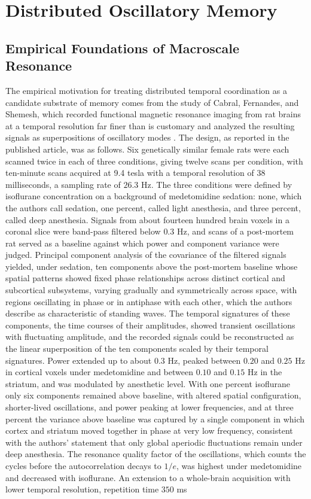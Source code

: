 \part{Distributed Oscillatory Memory}

\chapter{Empirical Foundations of Macroscale Resonance}\label{ch:cabral}

The empirical motivation for treating distributed temporal coordination as a candidate substrate of memory comes from the study of Cabral, Fernandes, and Shemesh, which recorded functional magnetic resonance imaging from rat brains at a temporal resolution far finer than is customary and analyzed the resulting signals as superpositions of oscillatory modes \cite{cabral2023}. The design, as reported in the published article, was as follows. Six genetically similar female rats were each scanned twice in each of three conditions, giving twelve scans per condition, with ten-minute scans acquired at 9.4 tesla with a temporal resolution of 38 milliseconds, a sampling rate of $26.3$ Hz. The three conditions were defined by isoflurane concentration on a background of medetomidine sedation: none, which the authors call sedation, one percent, called light anesthesia, and three percent, called deep anesthesia. Signals from about fourteen hundred brain voxels in a coronal slice were band-pass filtered below $0.3$ Hz, and scans of a post-mortem rat served as a baseline against which power and component variance were judged. Principal component analysis of the covariance of the filtered signals yielded, under sedation, ten components above the post-mortem baseline whose spatial patterns showed fixed phase relationships across distinct cortical and subcortical subsystems, varying gradually and symmetrically across space, with regions oscillating in phase or in antiphase with each other, which the authors describe as characteristic of standing waves. The temporal signatures of these components, the time courses of their amplitudes, showed transient oscillations with fluctuating amplitude, and the recorded signals could be reconstructed as the linear superposition of the ten components scaled by their temporal signatures. Power extended up to about $0.3$ Hz, peaked between $0.20$ and $0.25$ Hz in cortical voxels under medetomidine and between $0.10$ and $0.15$ Hz in the striatum, and was modulated by anesthetic level. With one percent isoflurane only six components remained above baseline, with altered spatial configuration, shorter-lived oscillations, and power peaking at lower frequencies, and at three percent the variance above baseline was captured by a single component in which cortex and striatum moved together in phase at very low frequency, consistent with the authors' statement that only global aperiodic fluctuations remain under deep anesthesia. The resonance quality factor of the oscillations, which counts the cycles before the autocorrelation decays to $1/e$, was highest under medetomidine and decreased with isoflurane. An extension to a whole-brain acquisition with lower temporal resolution, repetition time $350$ ms 